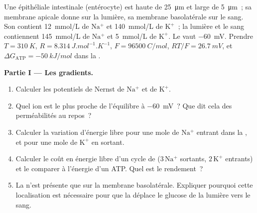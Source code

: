 \begin{problem}
\label{pb:b1:membranes-transport:1}
Une  épithéliale intestinale (entérocyte) est haute de
\qty{25}{\micro m} et large de \qty{5}{\micro m}~; sa membrane apicale
donne sur la lumière, sa membrane basolatérale sur le sang. Son 
contient \qty{12}{mmol/L} de $\mathrm{Na^+}$ et \qty{140}{mmol/L} de
$\mathrm{K^+}$~; la lumière et le sang contiennent \qty{145}{mmol/L} de
$\mathrm{Na^+}$ et \qty{5}{mmol/L} de $\mathrm{K^+}$. Le  vaut \qty{-60}{mV}. Prendre $T = \qty{310}{K}$,
$R = \qty{8.314}{J.mol^{-1}.K^{-1}}$, $F = \qty{96500}{C/mol}$,
$RT/F = \qty{26.7}{mV}$, et
$\Delta G_{\text{ATP}} = \qty{-50}{kJ/mol}$ dans la .

\medskip
\noindent\textbf{Partie I --- Les gradients.}
\begin{enumerate}
  \item Calculer les potentiels de Nernst de $\mathrm{Na^+}$ et de
        $\mathrm{K^+}$.
  \item Quel ion est le plus proche de l'équilibre à \qty{-60}{mV}~? Que
        dit cela des perméabilités au repos~?
  \item Calculer la variation d'énergie libre pour une mole de
        $\mathrm{Na^+}$ entrant dans la , et pour une mole de
        $\mathrm{K^+}$ en sortant.
  \item Calculer le coût en énergie libre d'un cycle de 
        ($3\,\mathrm{Na^+}$ sortants, $2\,\mathrm{K^+}$ entrants) et le
        comparer à l'énergie d'un ATP. Quel est le rendement~?
  \item La  n'est présente que sur la membrane basolatérale.
        Expliquer pourquoi cette localisation est nécessaire pour que la
         déplace le glucose de la lumière vers le sang.
\end{enumerate}


\end{problem}
